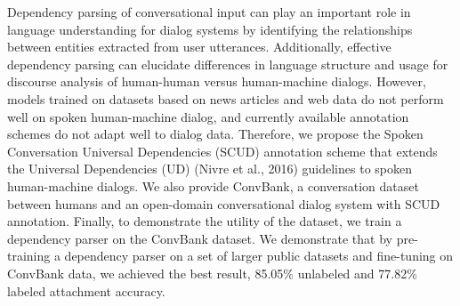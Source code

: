 Dependency parsing of conversational input can play an important role in language understanding for dialog systems by identifying the relationships between entities extracted from user utterances. Additionally, effective dependency parsing can elucidate differences in language structure and usage for discourse analysis of human-human versus human-machine dialogs. However, models trained on datasets based on news articles and web data do not perform well on spoken human-machine dialog, and currently available annotation schemes do not adapt well to dialog data. Therefore, we propose the Spoken Conversation Universal Dependencies (SCUD) annotation scheme that extends the Universal Dependencies (UD) (Nivre et al., 2016) guidelines to spoken human-machine dialogs. We also provide ConvBank, a conversation dataset between humans and an open-domain conversational dialog system with SCUD annotation. Finally, to demonstrate the utility of the dataset, we train a dependency parser on the ConvBank dataset. We demonstrate that by pre-training a dependency parser on a set of larger public datasets and fine-tuning on ConvBank data, we achieved the best result, 85.05\% unlabeled and 77.82\% labeled attachment accuracy.